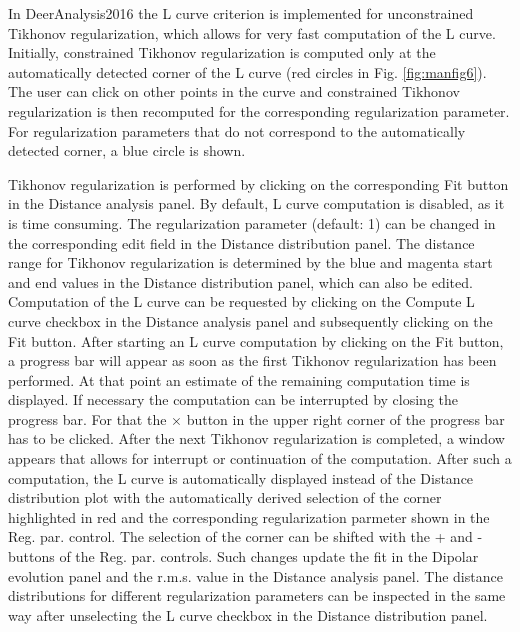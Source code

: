 \documentclass{article}
\begin{document}
In DeerAnalysis2016 the L curve criterion is implemented for unconstrained Tikhonov regularization, which allows for very fast computation of the L curve. Initially, constrained Tikhonov regularization is computed only at the automatically detected corner of the L curve (red circles in Fig. \ref{fig:manfig6}). The user can click on other points in the curve and constrained Tikhonov regularization is then recomputed for the corresponding regularization parameter. For regularization parameters that do not correspond to the automatically detected corner, a blue circle is shown.

Tikhonov regularization is performed by clicking on the corresponding {\ttfamily Fit} button in the {\ttfamily Distance analysis} panel. By default, L curve computation is disabled, as it is time consuming. The regularization parameter (default: 1) can be changed in the corresponding edit field in the {\ttfamily Distance distribution} panel. The distance range for Tikhonov regularization is determined by the blue and magenta start and end values in the {\ttfamily Distance distribution} panel, which can also be edited. Computation of the L curve can be requested by clicking on the {\ttfamily Compute L curve} checkbox in the {\ttfamily Distance analysis} panel and subsequently clicking on the {\ttfamily Fit} button. After starting an L curve computation by clicking on the {\ttfamily Fit} button, a progress bar will appear as soon as the first Tikhonov regularization has been performed. At that point an estimate of the remaining computation time is displayed. If necessary the computation can be interrupted by closing the progress bar. For that the $\times$ button in the upper right corner of the progress bar has to be clicked. After the next Tikhonov regularization is completed, a window appears that allows for interrupt or continuation of the computation. After such a computation, the L curve is automatically displayed instead of the {\ttfamily Distance distribution} plot with the automatically derived selection of the corner highlighted in red and the corresponding regularization parmeter shown in the {\ttfamily Reg. par.} control. The selection of the corner can be shifted with the {\ttfamily +} and {\ttfamily -} buttons of the {\ttfamily Reg. par.} controls. Such changes update the fit in the {\ttfamily Dipolar evolution} panel and the r.m.s. value in the {\ttfamily Distance analysis} panel. The distance distributions for different regularization parameters can be inspected in the same way after unselecting the {\ttfamily L curve} checkbox in the {\ttfamily Distance distribution} panel.
\end{document}
